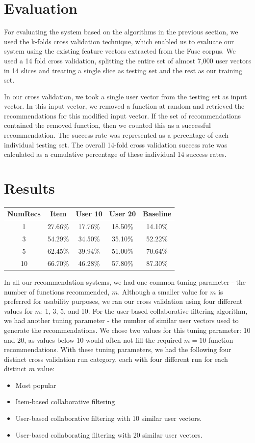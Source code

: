 \documentclass{article} %
\begin{document}
\section{Evaluation}
For evaluating the system based on the algorithms in the previous section, we used the k-folds cross validation technique, which enabled us to evaluate our system using the existing feature vectors extracted from the Fuse corpus. We used a 14 fold cross validation, splitting the entire set of almost 7,000 user vectors in 14 slices and treating a single slice as testing set and the rest as our training set.

In our cross validation, we took a single user vector from the testing set as input vector. In this input vector, we removed a function at random and retrieved the recommendations for this modified input vector. If the set of recommendations contained the removed function, then we counted this as a successful recommendation. The success rate was represented as a percentage of each individual testing set. The overall 14-fold cross validation success rate was calculated as a cumulative percentage of these individual 14 success rates.

\section{Results}

\begin{tabular}{|c|c|c|c|c|}
    \hline
    NumRecs & Item & User 10 & User 20 & Baseline  \\
    \hline
    1 & 27.66\% & 17.76\%  & 18.50\% & 14.10\%\\
    3 & 54.29\% & 34.50\% & 35.10\% & 52.22\%\\
    5 & 62.45\% & 39.94\% & 51.00\% & 70.64\%\\
    10 & 66.70\% & 46.28\% & 57.80\% & 87.30\%\\
    \hline
\end{tabular}

In all our recommendation systems, we had one common tuning parameter - the number of functions recommended, $m$. Although a smaller value for $m$ is preferred for usability purposes, we ran our cross validation using four different values for $m$: 1, 3, 5, and 10. For the user-based collaborative filtering algorithm, we had another tuning parameter - the number of similar user vectors used to generate the recommendations. We chose two values for this tuning parameter: 10 and 20, as values below 10 would often not fill the required $m=10$ function recommendations. With these tuning parameters, we had the following four distinct cross validation run category, each with four different run for each distinct $m$ value:
\begin{itemize}
   \item Most popular
   \item Item-based collaborative filtering
   \item User-based collaborative filtering with 10 similar user vectors.
   \item User-based collaborating filtering with 20 similar user vectors.
\end{itemize}
\end{document}
